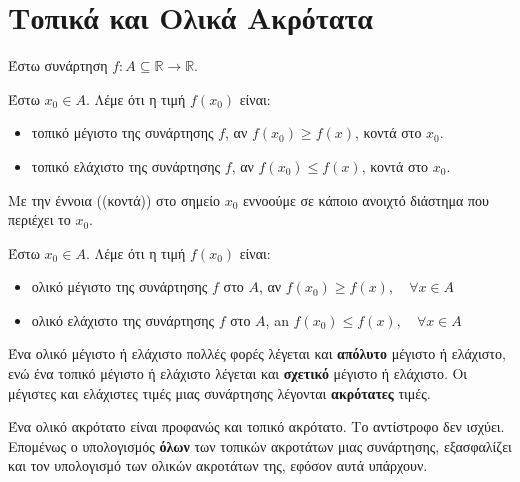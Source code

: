 


\everymath{\displaystyle}
\pagestyle{vangelis}




\chapter*{Τοπικά και Ολικά Ακρότατα}

Έστω συνάρτηση $ f \colon A \subseteq \mathbb{R} \to \mathbb{R} $.

\begin{dfn}
  Έστω $ x_{0} \in A $.  Λέμε ότι η τιμή $ f(x_{0}) $ είναι:
  \begin{itemize}
    \item \textcolor{Col1}{τοπικό μέγιστο}\phantom{a} της συνάρτησης $f$, αν 
      $ f(x_{0}) \geq f(x) $, κοντά στο $ x_{0} $.
    \item \textcolor{Col1}{τοπικό ελάχιστο} της συνάρτησης $f$, αν 
      $ f(x_{0}) \leq f(x) $, κοντά στο $ x_{0} $.  
  \end{itemize}
\end{dfn}

Με την έννοια ((κοντά)) στο σημείο $ x_{0} $ εννοούμε σε κάποιο ανοιχτό διάστημα που 
περιέχει το $ x_{0} $.

\begin{dfn}
  Έστω $ x_{0} \in A $.  Λέμε ότι η τιμή $ f(x_{0}) $ είναι:
  \begin{itemize}
    \item \textcolor{Col1}{ολικό μέγιστο}\phantom{a} της συνάρτησης $f$ στο $ A $, αν 
      $ f(x_{0}) \geq f(x),\quad \forall x \in A $
    \item \textcolor{Col1}{ολικό ελάχιστο} της συνάρτησης $f$ στο $ A $, an 
      $ f(x_{0}) \leq f(x),\quad \forall x \in A $
  \end{itemize}
\end{dfn}

Ένα ολικό μέγιστο ή ελάχιστο πολλές φορές λέγεται και \textbf{απόλυτο} μέγιστο ή 
ελάχιστο, ενώ ένα τοπικό μέγιστο ή ελάχιστο λέγεται και \textbf{σχετικό} μέγιστο ή 
ελάχιστο.  Οι μέγιστες και ελάχιστες τιμές μιας συνάρτησης λέγονται \textbf{ακρότατες} 
τιμές.

\begin{rem}
  Ένα ολικό ακρότατο είναι προφανώς και τοπικό ακρότατο. Το αντίστροφο δεν ισχύει. 
  Επομένως ο υπολογισμός \textbf{όλων} των τοπικών ακροτάτων μιας συνάρτησης, 
  εξασφαλίζει και τον υπολογισμό των ολικών ακροτάτων της, εφόσον αυτά υπάρχουν.
\end{rem}

